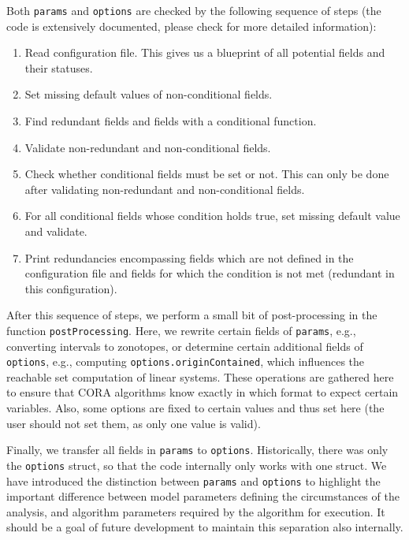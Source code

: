 Both \texttt{params} and \texttt{options} are checked by the following sequence of steps
(the code is extensively documented, please check for more detailed information):
%
\begin{enumerate}
	\item Read configuration file.
		This gives us a blueprint of all potential fields and their statuses.
	\item Set missing default values of non-conditional fields.
	\item Find redundant fields and fields with a conditional function.
	\item Validate non-redundant and non-conditional fields.
	\item Check whether conditional fields must be set or not.
		This can only be done after validating non-redundant and non-conditional fields.
	\item For all conditional fields whose condition holds true, set missing default value and validate.
	\item Print redundancies encompassing fields which are not defined in the configuration file
			and fields for which the condition is not met (redundant in this configuration).
\end{enumerate}

After this sequence of steps, we perform a small bit of post-processing in the function \texttt{postProcessing}.
Here, we rewrite certain fields of \texttt{params}, e.g., converting intervals to zonotopes, or determine certain additional fields of \texttt{options}, e.g., computing \texttt{options.originContained}, which influences the reachable set computation of linear systems.
These operations are gathered here to ensure that CORA algorithms know exactly in which format to expect certain variables.
Also, some options are fixed to certain values and thus set here (the user should not set them, as only one value is valid).

Finally, we transfer all fields in \texttt{params} to \texttt{options}.
Historically, there was only the \texttt{options} struct, so that the code internally only works with one struct.
We have introduced the distinction between \texttt{params} and \texttt{options} to highlight the important difference between model parameters defining the circumstances of the analysis, and algorithm parameters required by the algorithm for execution.
It should be a goal of future development to maintain this separation also internally.






